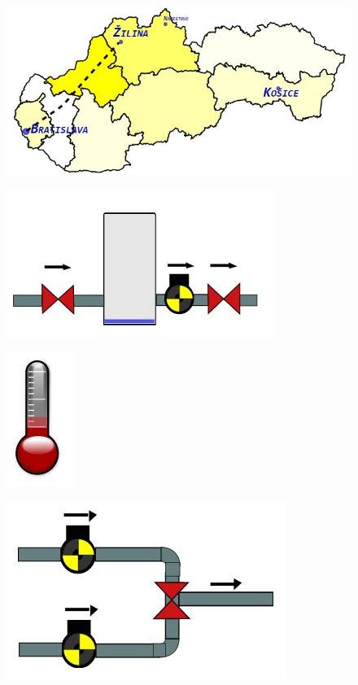 \begin{figure}[H]
	\centering
	\includegraphics[width=0.7\linewidth]{obrazky/map}
\caption{}
\label{fig:map}
\end{figure}
\begin{figure}[H]
	\centering
	\includegraphics[width=0.7\linewidth]{obrazky/pump}
\caption{}
\label{fig:pump}
\end{figure}
\begin{figure}[H]
	\centering
	\includegraphics{obrazky/thermometer}
\caption{}
\label{fig:thermometer}
\end{figure}

\begin{figure}[H]
\centering
\includegraphics[width=0.7\linewidth]{obrazky/trippleValve}
\caption{}
\label{fig:trippleValve}
\end{figure}
